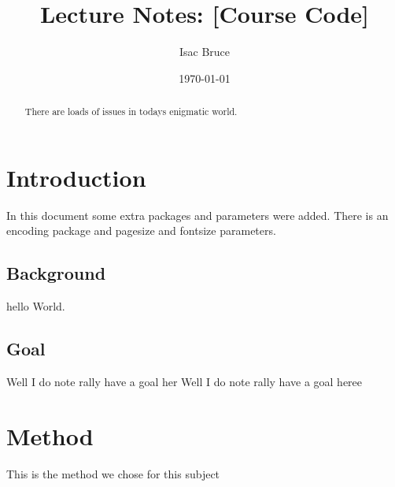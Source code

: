 \documentclass[12pt, a4, twoside]{article}
\title{Lecture Notes: [Course Code]}
\author{Isac Bruce}
\date{\today}
\begin{document}
\begin{titlepage}
\maketitle
\end{titlepage}

\begin{abstract}
There are loads of issues in todays enigmatic world.
\end{abstract}
\pagebreak

\tableofcontents
\pagebreak

\section{Introduction}
In this document some extra packages and parameters
were added. There is an encoding package
and pagesize and fontsize parameters.
\subsection{Background}
hello World.

\subsection{Goal}
Well I do note rally have a goal her
Well I do note rally have a goal heree

\pagebreak
\section{Method}
This is the method we chose for this subject
\end{document}
